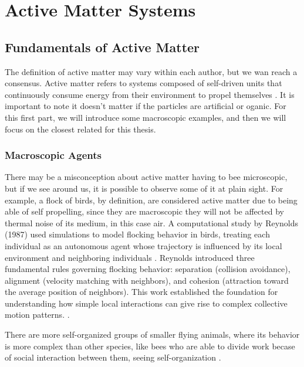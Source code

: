 \chapter{Active Matter Systems}
\label{ch:activeandpassivemattersystems}

\section{Fundamentals of Active Matter}

The definition of active matter may vary within each author, but we wan reach a consensus. Active matter refers to systems composed of self-driven units that continuously consume energy from their environment to propel themselves \cite{marchetti2013hydrodynamics, ramaswamy2010mechanics}. It is important to note it doesn't matter if the particles are artificial or oganic. For this first part, we will introduce some macroscopic examples, and then we will focus on the closest related for this thesis.

\subsection{Macroscopic Agents}

There may be a misconception about active matter having to bee microscopic, but if we see around us, it is possible to observe some of it at plain sight. For example, a flock of birds, by definition, are considered active matter due to being able of self propelling, since they are macroscopic they will not be affected by thermal noise of its medium, in this case air. A computational study by Reynolds (1987) used simulations to model flocking behavior in birds, treating each individual as an autonomous agent whose trajectory is influenced by its local environment and neighboring individuals \cite{reynolds1987flocks}. Reynolds introduced three fundamental rules governing flocking behavior: separation (collision avoidance), alignment (velocity matching with neighbors), and cohesion (attraction toward the average position of neighbors). This work established the foundation for understanding how simple local interactions can give rise to complex collective motion patterns. \cite{hildenbrandt2010self}.

There are more self-organized groups of smaller flying animals, where its behavior is more complex than other species, like bees who are able to divide work becase of social interaction between them,  seeing self-organization \cite{jeanson2005emergence}.


